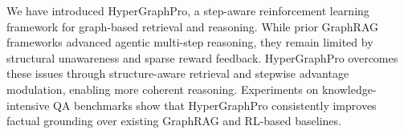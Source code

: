We have introduced HyperGraphPro, a step-aware reinforcement learning framework for graph-based retrieval and reasoning.
While prior GraphRAG frameworks advanced agentic multi-step reasoning, they remain limited by structural unawareness and sparse reward feedback.
HyperGraphPro overcomes these issues through structure-aware retrieval and stepwise advantage modulation, enabling more coherent reasoning.
Experiments on knowledge-intensive QA benchmarks show that HyperGraphPro consistently improves factual grounding over existing GraphRAG and RL-based baselines.